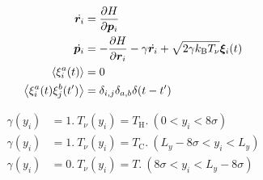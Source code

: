 \documentclass[dvipdfmx]{jsarticle}
\numberwithin{equation}{subsection}
\begin{document}
\begin{align}
  \dot{\bm{r}_i} &= \pdv{H}{\bm{p}_i} \\
  \dot{\bm{p}_i} &= - \pdv{H}{\bm{r}_i} - \gamma \dot{\bm{r}_i} + \sqrt{2 \gamma k_{\text{B}}T_{\nu}}\bm{\xi}_i (t) \\
  \expval{\xi_{i}^{a}(t)} &= 0 \\
  \expval{\xi_{i}^{a}(t)\xi_{j}^{b}(t')} &= \delta_{i,j} \delta_{a,b}\delta (t-t') 
\end{align}

\begin{align}
  \gamma(y_i) &= 1. \ T_{\nu}(y_i) = T_{\text{H}}. \ (0 < y_i < 8\sigma) \\
  \gamma(y_i) &= 1. \ T_{\nu}(y_i) = T_{\text{C}}. \ (L_y - 8\sigma < y_i < L_y) \\
  \gamma(y_i) &= 0. \ T_{\nu}(y_i) = T. \ (8\sigma < y_i < L_y - 8\sigma)
\end{align}












\end{document}
